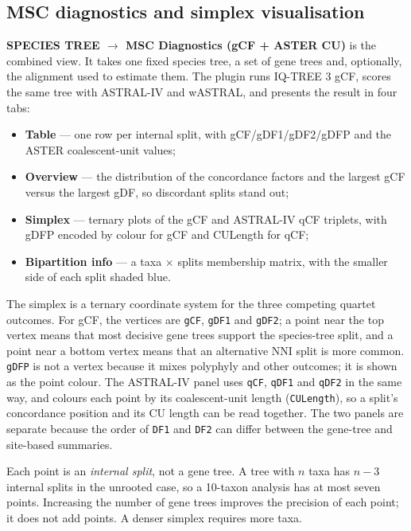 \documentclass[10pt]{report}
\begin{document}
\subsection{MSC diagnostics and simplex visualisation}

\textbf{SPECIES TREE $\rightarrow$ MSC Diagnostics (gCF + ASTER CU)} is the
combined view. It takes one fixed species tree, a set of gene trees and,
optionally, the alignment used to estimate them. The plugin runs IQ-TREE 3
gCF, scores the same tree with ASTRAL-IV and wASTRAL, and presents the result
in four tabs:

\begin{itemize}
  \item \textbf{Table} --- one row per internal split, with gCF/gDF1/gDF2/gDFP
        and the ASTER coalescent-unit values;
  \item \textbf{Overview} --- the distribution of the concordance factors and
        the largest gCF versus the largest gDF, so discordant splits stand
        out;
  \item \textbf{Simplex} --- ternary plots of the gCF and ASTRAL-IV qCF
        triplets, with gDFP encoded by colour for gCF and CULength for qCF;
  \item \textbf{Bipartition info} --- a taxa $\times$ splits membership
        matrix, with the smaller side of each split shaded blue.
\end{itemize}

The simplex is a ternary coordinate system for the three competing quartet
outcomes. For gCF, the vertices are \texttt{gCF}, \texttt{gDF1} and
\texttt{gDF2}; a point near the top vertex means that most decisive gene trees
support the species-tree split, and a point near a bottom vertex means that an
alternative NNI split is more common. \texttt{gDFP} is not a vertex because it
mixes polyphyly and other outcomes; it is shown as the point colour. The
ASTRAL-IV panel uses \texttt{qCF}, \texttt{qDF1} and \texttt{qDF2} in the same
way, and colours each point by its coalescent-unit length (\texttt{CULength}),
so a split's concordance position and its CU length can be read together. The
two panels are separate because the order of \texttt{DF1} and \texttt{DF2} can
differ between the gene-tree and site-based summaries.

Each point is an \emph{internal split}, not a gene tree. A tree with $n$ taxa
has $n-3$ internal splits in the unrooted case, so a 10-taxon analysis has at
most seven points. Increasing the number of gene trees improves the precision
of each point; it does not add points. A denser simplex requires more taxa.
\end{document}
